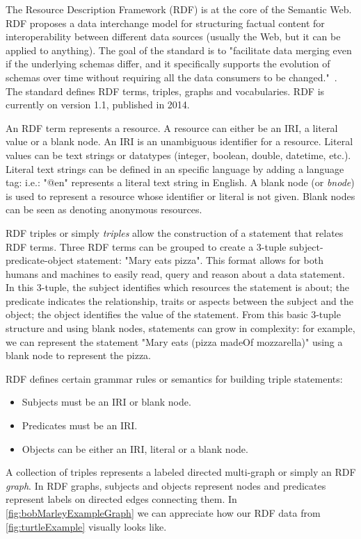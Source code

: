 The Resource Description Framework (RDF) \cite{rdfConcepts, rdfprimer11} is at the core of the Semantic Web. RDF proposes a data interchange model for structuring factual content for interoperability between different data sources (usually the Web, but it can be applied to anything). The goal of the standard is to "facilitate data merging even if the underlying schemas differ, and it specifically supports the evolution of schemas over time without requiring all the data consumers to be changed."~\cite{W3CRDF}. The standard defines RDF terms, triples, graphs and vocabularies. RDF is currently on version 1.1, published in 2014.

An RDF term represents a resource. A resource can either be an IRI, a literal value or a blank node. An IRI is an unambiguous identifier for a resource. Literal values can be text strings or datatypes (integer, boolean, double, datetime, etc.). Literal text strings can be defined in an specific language by adding a language tag: i.e.: "@en" represents a literal text string in English. A blank node (or \textit{bnode}) is used to represent a resource whose identifier or literal is not given. Blank nodes can be seen as denoting anonymous resources.

RDF triples or simply \textit{triples} allow the construction of a statement that relates RDF terms. Three RDF terms can be grouped to create a 3-tuple subject-predicate-object statement: "Mary eats pizza". This format allows for both humans and machines to easily read, query and reason about a data statement. 
In this 3-tuple, the subject identifies which resources the statement is about; the predicate indicates the relationship, traits or aspects between the subject and the object; the object identifies the value of the statement. From this basic 3-tuple structure and using blank nodes, statements can grow in complexity: for example, we can represent the statement "Mary eats (pizza madeOf mozzarella)" using a blank node to represent the pizza.

RDF defines certain grammar rules or semantics \cite{RDFSemantics} for building triple statements:
\begin{itemize}
    \item Subjects must be an IRI or blank node.
    \item Predicates must be an IRI.
    \item Objects can be either an IRI, literal or a blank node.
\end{itemize}

A collection of triples represents a labeled directed multi-graph or simply an RDF \textit{graph}. In RDF graphs, subjects and objects represent nodes and predicates represent labels on directed edges connecting them. In \autoref{fig:bobMarleyExampleGraph} we can appreciate how our RDF data from \autoref{fig:turtleExample} visually looks like.

